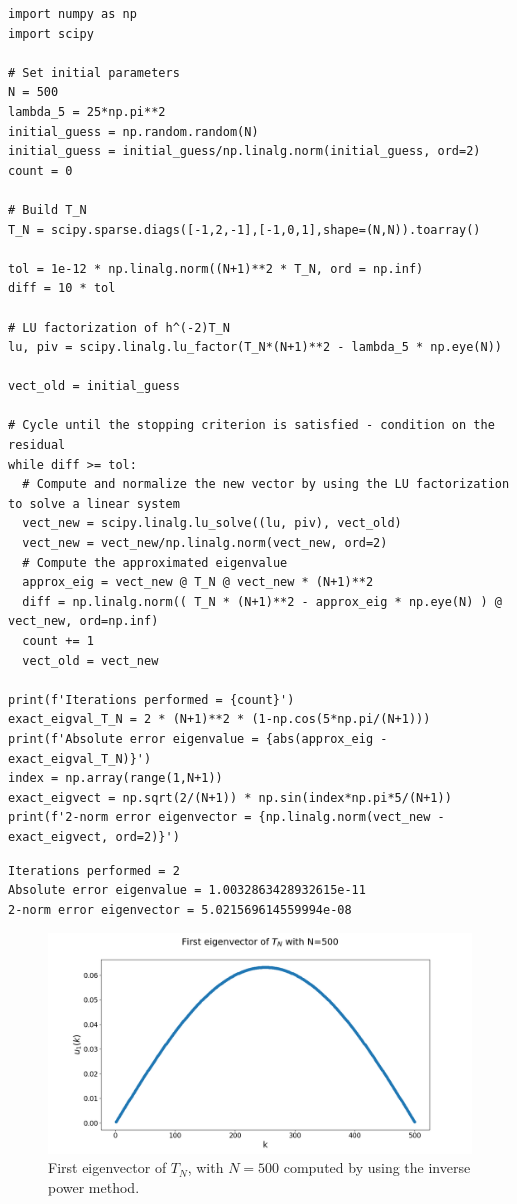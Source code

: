 \documentclass[a4paper,11pt]{article}
\begin{document}
\begin{verbatim}
import numpy as np
import scipy

# Set initial parameters
N = 500
lambda_5 = 25*np.pi**2
initial_guess = np.random.random(N)
initial_guess = initial_guess/np.linalg.norm(initial_guess, ord=2)
count = 0

# Build T_N
T_N = scipy.sparse.diags([-1,2,-1],[-1,0,1],shape=(N,N)).toarray()

tol = 1e-12 * np.linalg.norm((N+1)**2 * T_N, ord = np.inf)
diff = 10 * tol

# LU factorization of h^(-2)T_N
lu, piv = scipy.linalg.lu_factor(T_N*(N+1)**2 - lambda_5 * np.eye(N))

vect_old = initial_guess

# Cycle until the stopping criterion is satisfied - condition on the residual
while diff >= tol:
  # Compute and normalize the new vector by using the LU factorization to solve a linear system
  vect_new = scipy.linalg.lu_solve((lu, piv), vect_old)  
  vect_new = vect_new/np.linalg.norm(vect_new, ord=2)
  # Compute the approximated eigenvalue
  approx_eig = vect_new @ T_N @ vect_new * (N+1)**2
  diff = np.linalg.norm(( T_N * (N+1)**2 - approx_eig * np.eye(N) ) @ vect_new, ord=np.inf)
  count += 1
  vect_old = vect_new

print(f'Iterations performed = {count}')
exact_eigval_T_N = 2 * (N+1)**2 * (1-np.cos(5*np.pi/(N+1)))
print(f'Absolute error eigenvalue = {abs(approx_eig - exact_eigval_T_N)}')
index = np.array(range(1,N+1))
exact_eigvect = np.sqrt(2/(N+1)) * np.sin(index*np.pi*5/(N+1))
print(f'2-norm error eigenvector = {np.linalg.norm(vect_new - exact_eigvect, ord=2)}')
\end{verbatim}

\begin{verbatim}
Iterations performed = 2
Absolute error eigenvalue = 1.0032863428932615e-11
2-norm error eigenvector = 5.021569614559994e-08
\end{verbatim}

\begin{figure}[H]
	\centering
	\includegraphics[scale=0.40]{Plot/First_eigvect_tn_n=500.png}
	\caption{First eigenvector of $T_{N}$, with $N=500$ computed by using the inverse power method.}
	\label{Fig:First_eigvect_Tn}
\end{figure}
\end{document}
